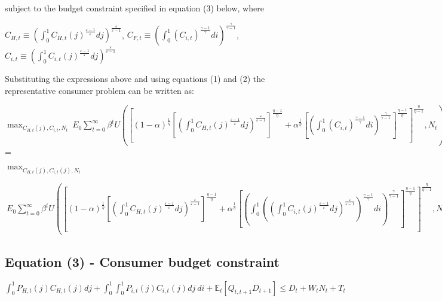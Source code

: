 \documentclass[
]{article}
\begin{document}
subject to the budget constraint specified in equation (3) below, where

\(C_{H,t} \equiv \displaystyle \left( \int_0^1 C_{H,t}(j)^{\frac{\varepsilon-1}{\varepsilon}}dj \right) ^{\frac{\varepsilon}{\varepsilon-1}}\),
\(C_{F,t} \equiv \displaystyle \left( \int_0^1 (C_{i,t})^{\frac{\gamma-1}{\gamma}}di \right) ^{\frac{\gamma}{\gamma-1}}\),
\(C_{i,t} \equiv \displaystyle \left( \int_0^1 C_{i,t}(j)^{\frac{\varepsilon-1}{\varepsilon}}dj \right) ^{\frac{\varepsilon}{\varepsilon-1}}\)

Substituting the expressions above and using equations (1) and (2) the
representative consumer problem can be written as:

\(\displaystyle \max_{C_{H,t}(j),C_{i,t},N_t} \ E_0 \sum_{t=0}^\infty \beta^tU \left(\left[ (1-\alpha)^{\frac{1}{\eta}} \left [\displaystyle \left( \int_0^1 C_{H,t}(j)^{\frac{\varepsilon-1}{\varepsilon}}dj \right) ^{\frac{\varepsilon}{\varepsilon-1}} \right]^{\frac{\eta-1}{\eta}} + \alpha^{\frac{1}{\eta}} \left[ \displaystyle \left( \int_0^1 (C_{i,t})^{\frac{\gamma-1}{\gamma}}di \right) ^{\frac{\gamma}{\gamma-1}} \right]^{\frac{\eta-1}{\eta}} \right]^{\frac{\eta}{\eta-1}},N_t \right)\)
=

\(\displaystyle \max_{C_{H,t}(j),C_{i,t}(j),N_t}\)

\(\ E_0 \sum_{t=0}^\infty \beta^tU \left(\left[ (1-\alpha)^{\frac{1}{\eta}} \left [\displaystyle \left( \int_0^1 C_{H,t}(j)^{\frac{\varepsilon-1}{\varepsilon}}dj \right) ^{\frac{\varepsilon}{\varepsilon-1}} \right]^{\frac{\eta-1}{\eta}} + \alpha^{\frac{1}{\eta}} \left[ \displaystyle \left( \int_0^1 \left( \displaystyle \left( \int_0^1 C_{i,t}(j)^{\frac{\varepsilon-1}{\varepsilon}}dj \right) ^{\frac{\varepsilon}{\varepsilon-1}} \right)^{\frac{\gamma-1}{\gamma}}di \right) ^{\frac{\gamma}{\gamma-1}} \right]^{\frac{\eta-1}{\eta}} \right]^{\frac{\eta}{\eta-1}},N_t \right)\)

\vspace{12pt}

\hypertarget{equation-3---consumer-budget-constraint}{%
\subsection{Equation (3) - Consumer budget
constraint}\label{equation-3---consumer-budget-constraint}}

\vspace{8pt}

\(\displaystyle \int_0^1 P_{H,t}(j)C_{H,t}(j)dj + \int_0^1\int_0^1 P_{i,t}(j)C_{i,t}(j)dj\ di + \mathbb{E}_t[ Q_{t,t+1}D_{t+1}] \leq D_t + W_tN_t + T_t\)
\end{document}
